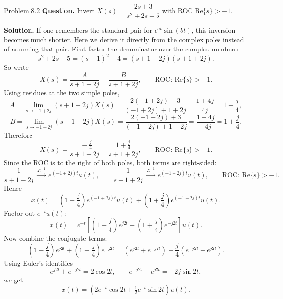 \documentclass[10pt]{article}
\newcommand{\ROC}{\mathrm{ROC}}
\newcommand{\LT}{\mathcal{L}}
\newcommand{\Prompt}[1]{\textbf{Question.} #1}
\newcommand{\SketchLabel}{\tcblower\textbf{Solution.}}
\newcommand{\Linvpair}[2]{#1\,\mathrel{\overset{\LT^{-1}}{\longrightarrow}}\,#2}
\begin{document}
\begin{examplebox}{Problem 8.2}
  \Prompt{Invert \(X(s)=\dfrac{2s+3}{s^2+2s+5}\) with ROC \(\text{Re}\{s\}>-1\).}

  \medskip
  \SketchLabel{}
  If one remembers the standard pair for \(e^{at}\sin(bt)\), this inversion becomes much shorter. Here we derive it directly from the complex poles instead of assuming that pair.
  First factor the denominator over the complex numbers:
  \[
    s^2+2s+5=(s+1)^2+4=(s+1-2j)(s+1+2j).
  \]
  So write
  \[
    X(s)=\frac{A}{s+1-2j}+\frac{B}{s+1+2j},
    \qquad
    \ROC:\ \text{Re}\{s\}>-1.
  \]
  Using residues at the two simple poles,
  \[
    A=\lim_{s\to -1+2j}(s+1-2j)X(s)
    =\frac{2(-1+2j)+3}{(-1+2j)+1+2j}
    =\frac{1+4j}{4j}
    =1-\frac{j}{4},
  \]
  \[
    B=\lim_{s\to -1-2j}(s+1+2j)X(s)
    =\frac{2(-1-2j)+3}{(-1-2j)+1-2j}
    =\frac{1-4j}{-4j}
    =1+\frac{j}{4}.
  \]
  Therefore
  \[
    X(s)=\frac{1-\frac{j}{4}}{s+1-2j}+\frac{1+\frac{j}{4}}{s+1+2j},
    \qquad
    \ROC:\ \text{Re}\{s\}>-1.
  \]
  Since the ROC is to the right of both poles, both terms are right-sided:
  \[
    \Linvpair{\frac{1}{s+1-2j}}{e^{(-1+2j)t}u(t)},
    \qquad
    \Linvpair{\frac{1}{s+1+2j}}{e^{(-1-2j)t}u(t)},
    \qquad
    \ROC:\ \text{Re}\{s\}>-1.
  \]
  Hence
  \[
    x(t)=\left(1-\frac{j}{4}\right)e^{(-1+2j)t}u(t)
    +\left(1+\frac{j}{4}\right)e^{(-1-2j)t}u(t).
  \]
  Factor out \(e^{-t}u(t)\):
  \[
    x(t)=e^{-t}\left[\left(1-\frac{j}{4}\right)e^{j2t}
    +\left(1+\frac{j}{4}\right)e^{-j2t}\right]u(t).
  \]
  Now combine the conjugate terms:
  \[
    \left(1-\frac{j}{4}\right)e^{j2t}
    +\left(1+\frac{j}{4}\right)e^{-j2t}
    =(e^{j2t}+e^{-j2t})+\frac{j}{4}(e^{-j2t}-e^{j2t}).
  \]
  Using Euler's identities
  \[
    e^{j2t}+e^{-j2t}=2\cos 2t,
    \qquad
    e^{-j2t}-e^{j2t}=-2j\sin 2t,
  \]
  we get
  \[
    x(t)=\left(2e^{-t}\cos 2t+\tfrac{1}{2}e^{-t}\sin 2t\right)u(t).
  \]


\end{examplebox}
\end{document}
